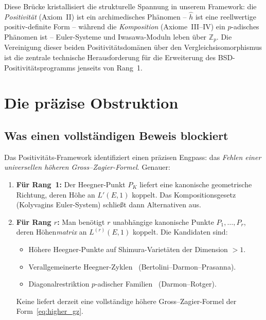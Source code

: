 \documentclass[aps,prd,twocolumn,superscriptaddress,nofootinbib,floatfix]{revtex4-2}
\theoremstyle{definition}
\theoremstyle{remark}
\begin{document}
Diese Brücke kristallisiert die strukturelle Spannung in unserem Framework: die \textit{Positivität} (Axiom~II) ist ein archimedisches Phänomen -- $\hat{h}$ ist eine reellwertige positiv-definite Form -- während die \textit{Komposition} (Axiome~III--IV) ein $p$-adisches Phänomen ist -- Euler-Systeme und Iwasawa-Moduln leben über $\mathbb{Z}_p$. Die Vereinigung dieser beiden \glqq Positivitätsdomänen\grqq{} über den Vergleichsisomorphismus ist die zentrale technische Herausforderung für die Erweiterung des BSD-Positivitätsprogramms jenseits von Rang~1.


\clearpage
\section{Die präzise Obstruktion}
\label{sec:obstruction}

\subsection{Was einen vollständigen Beweis blockiert}

Das Positivitäts-Framework identifiziert einen präzisen Engpass: das \textit{Fehlen einer universellen höheren Gross--Zagier-Formel}. Genauer:

\begin{enumerate}
\item \textbf{Für Rang~1:} Der Heegner-Punkt $P_K$ liefert eine kanonische \glqq geometrische Richtung\grqq{}, deren Höhe an $L'(E,1)$ koppelt. Das Kompositionsgesetz (Kolyvagins Euler-System) schließt dann Alternativen aus.

\item \textbf{Für Rang $r$:} Man benötigt $r$ unabhängige kanonische Punkte $P_1, \ldots, P_r$, deren Höhen\textit{matrix} an $L^{(r)}(E,1)$ koppelt. Die Kandidaten sind:
\begin{itemize}
\item Höhere Heegner-Punkte auf Shimura-Varietäten der Dimension $> 1$.
\item Verallgemeinerte Heegner-Zyklen~\cite{BDP2013} (Bertolini--Darmon--Prasanna).
\item Diagonalrestriktion $p$-adischer Familien~\cite{DarmonRotger2017} (Darmon--Rotger).
\end{itemize}
Keine liefert derzeit eine vollständige \glqq höhere Gross--Zagier-Formel\grqq{} der Form~\eqref{eq:higher_gz}.
\end{enumerate}
\end{document}
